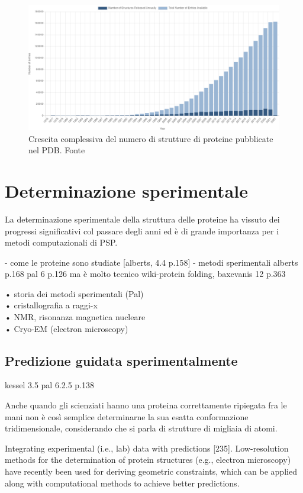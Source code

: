 \begin{figure}[!htb]
	\centering
	\includegraphics[scale=0.3]{images/pdb-statistica.png}
	\caption{Crescita complessiva del numero di strutture di proteine pubblicate nel PDB. Fonte\cite{pdbStats}}
	\label{fig:pdb-statistica}
\end{figure}


\section{Determinazione sperimentale} \label{sec:experimentally-guided-prediction}

La determinazione sperimentale della struttura delle proteine ha vissuto dei progressi significativi col passare degli anni ed è di grande importanza per i metodi computazionali di PSP.


- come le proteine sono studiate [alberts, 4.4 p.158]
- metodi sperimentali 
alberts p.168
pal 6 p.126 ma è molto tecnico
wiki-protein folding, 
baxevanis 12 p.363

• storia dei metodi sperimentali (Pal) \\
• cristallografia a raggi-x \\
• NMR, risonanza magnetica nucleare \\
• Cryo-EM (electron microscopy) \\
\subsection{Predizione guidata sperimentalmente}
kessel 3.5
pal 6.2.5 p.138

Anche quando gli scienziati hanno una proteina correttamente ripiegata fra le mani non è così semplice determinarne la sua esatta conformazione tridimensionale, considerando che si parla di strutture di migliaia di atomi.

 Integrating experimental (i.e., lab) data with predictions [235]. Low-resolution
methods for the determination of protein structures (e.g., electron microscopy) have
recently been used for deriving geometric constraints, which can be applied along
with computational methods to achieve better predictions.

